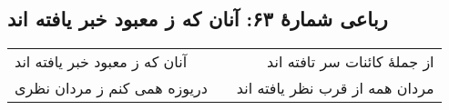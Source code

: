 \begin{center}
\section*{رباعی شمارهٔ ۶۳: آنان که ز معبود خبر یافته اند}
\label{sec:063}
\begin{longtable}{l p{0.5cm} r}
آنان که ز معبود خبر یافته اند
&&
از جملهٔ کائنات سر تافته اند
\\
دریوزه همی کنم ز مردان نظری
&&
مردان همه از قرب نظر یافته اند
\\
\end{longtable}
\end{center}
